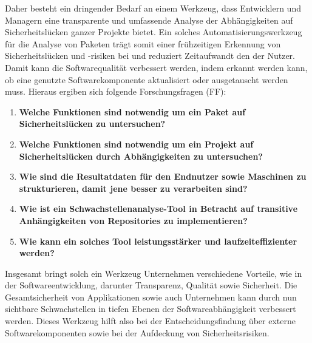     Daher besteht ein dringender Bedarf an einem Werkzeug, dass Entwicklern und Managern eine transparente und umfassende Analyse der Abhängigkeiten auf Sicherheitslücken ganzer Projekte bietet.
    Ein solches Automatisierungswerkzeug für die Analyse von Paketen trägt somit einer frühzeitigen Erkennung von Sicherheitslücken und -risiken bei und reduziert Zeitaufwandt den der Nutzer.
    Damit kann die Softwarequalität verbessert werden, indem erkannt werden kann, ob eine genutzte Softwarekomponente aktualisiert oder ausgetauscht werden muss.
    Hieraus ergiben sich folgende Forschungsfragen (FF):
    \begin{enumerate}[label=\textbf{FF-\Roman*}, leftmargin=1cm]
        \item \textbf{Welche Funktionen sind notwendig um ein Paket auf Sicherheitslücken zu untersuchen?} \label{q:one}
        \item \textbf{Welche Funktionen sind notwendig um ein Projekt auf Sicherheitslücken durch Abhängigkeiten zu untersuchen?} \label{q:two}
        \item \textbf{Wie sind die Resultatdaten für den Endnutzer sowie Maschinen zu strukturieren, damit jene besser zu verarbeiten sind?} \label{q:three}
        \item \textbf{Wie ist ein Schwachstellenanalyse-Tool in Betracht auf transitive Anhängigkeiten von Repositories zu implementieren?} \label{q:four}
        \item \textbf{Wie kann ein solches Tool leistungsstärker und laufzeiteffizienter werden?} \label{q:five}
    \end{enumerate}
    Insgesamt bringt solch ein Werkzeug Unternehmen verschiedene Vorteile, wie in der Softwareentwicklung, darunter Transparenz, Qualität sowie Sicherheit.
    Die Gesamtsicherheit von Applikationen sowie auch Unternehmen kann durch nun sichtbare Schwachstellen in tiefen Ebenen der Softwareabhängigkeit verbessert werden.
    Dieses Werkzeug hilft also bei der Entscheidungsfindung über externe Softwarekomponenten sowie bei der Aufdeckung von Sicherheitsrisiken.
    